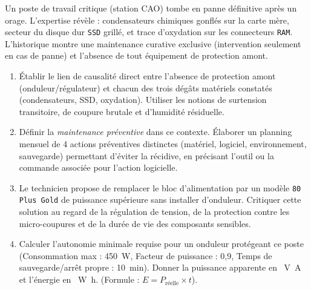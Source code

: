 \documentclass[11pt]{article}
\begin{document}
\begin{exercice}
Un poste de travail critique (station CAO) tombe en panne définitive après un orage. L'expertise révèle : condensateurs chimiques gonflés sur la carte mère, secteur du disque dur \texttt{SSD} grillé, et trace d'oxydation sur les connecteurs \texttt{RAM}. L'historique montre une maintenance curative exclusive (intervention seulement en cas de panne) et l'absence de tout équipement de protection amont.
\begin{enumerate}
    \item Établir le lien de causalité direct entre l'absence de protection amont (onduleur/régulateur) et chacun des trois dégâts matériels constatés (condensateurs, SSD, oxydation). Utiliser les notions de surtension transitoire, de coupure brutale et d'humidité résiduelle.
    \item Définir la \textit{maintenance préventive} dans ce contexte. Élaborer un planning mensuel de 4 actions préventives distinctes (matériel, logiciel, environnement, sauvegarde) permettant d'éviter la récidive, en précisant l'outil ou la commande associée pour l'action logicielle.
    \item Le technicien propose de remplacer le bloc d'alimentation par un modèle \texttt{80 Plus Gold} de puissance supérieure sans installer d'onduleur. Critiquer cette solution au regard de la régulation de tension, de la protection contre les micro-coupures et de la durée de vie des composants sensibles.
    \item Calculer l'autonomie minimale requise pour un onduleur protégeant ce poste (Consommation max : \SI{450}{\watt}, Facteur de puissance : 0,9, Temps de sauvegarde/arrêt propre : \SI{10}{\minute}). Donner la puissance apparente en \SI{}{\volt\ampere} et l'énergie en \SI{}{\watt\hour}. (Formule : $E = P_{\text{réelle}} \times t$).
\end{enumerate}
\end{exercice}
\end{document}
